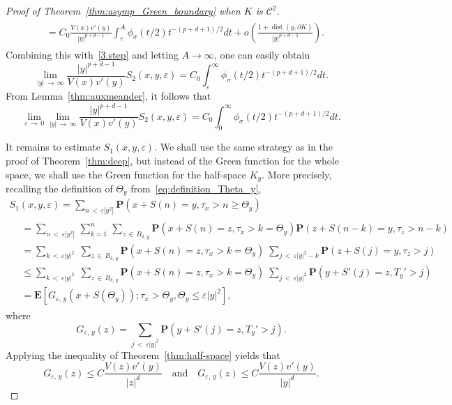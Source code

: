 \documentclass[AHL,Unicode,longabstracts,published]{cedram}
\DeclareMathOperator{\dist}{dist}
\newcommand{\clC}{\mathcal{C}}
\newcommand{\pr}{\mathbf{P}}
\newcommand{\e}{\mathbf{E}}
\renewcommand{\epsilon}{\varepsilon}
\renewcommand{\le}{\leqslant}
\renewcommand{\ge}{\geqslant}
\renewcommand{\leq}{\leqslant}
\begin{document}
\begin{proof}[Proof of Theorem~\ref{thm:asymp_Green_boundary} when $K$ is $\clC^{2}$]
\begin{multline*}
\begin{aligned}
&= C_0\frac{V(x)v'(y)}{|y|^{p+d-1}}\int_\varepsilon^A\phi_\sigma(t/2) t^{-(p+d+1)/2}dt +o\left(\frac{1+\dist(y, \partial K)}{|y|^{p+d-1}}\right).
\end{aligned}
\end{multline*}
Combining this with~\eqref{3.step} and letting $A\to\infty$, one can easily obtain
\[
\lim_{|y|\,\to\,\infty}\frac{|y|^{p+d-1}}{V(x)v'(y)}S_2(x,y,\varepsilon) =C_0\int_\varepsilon^\infty \phi_\sigma(t/2) t^{-(p+d+1)/2}dt.
\]
From Lemma~\ref{thm:auxmeander}, it follows that
\begin{equation}\label{S2.boundary}
\lim_{\varepsilon\,\to\,0}\lim_{|y|\,\to\,\infty}\frac{|y|^{p+d-1}}{V(x)v'(y)}S_2(x,y,\varepsilon) =C_0\int_0^\infty \phi_\sigma(t/2) t^{-(p+d+1)/2}dt.
\end{equation}

It remains to estimate $S_1(x,y,\varepsilon)$. We shall use the same strategy as in the proof of Theorem~\ref{thm:deep}, but instead of the Green function for the whole space, we shall use the Green function for the half-space $K_y$. More precisely, recalling the definition of $\Theta_y$ from~\eqref{eq:definition_Theta_y},
\begin{multline*}
S_1(x,y,\varepsilon)=\sum_{n\,<\,\varepsilon\left|y^2\right|}\pr\left(x+S(n)=y,\tau_x>n\ge\Theta_y\right)\\
\begin{aligned}
&=\sum_{n\,<\,\varepsilon\left|y^2\right|}\,\sum_{k=1}^n\,\sum_{z\,\in\,B_{\delta,\,y}}\!\!
\pr\left(x+S(n)=z,\tau_x>k=\Theta_y\right)\pr\left(z+S(n-k)=y,\tau_z>n-k\right)\\
&= \sum_{k\,<\,\varepsilon|y|^2}\;\sum_{z\,\in\,B_{\delta,\,y}}
\pr\left(x+S(n)=z,\tau_x>k=\Theta_y\right)\;\sum_{j\,<\,\varepsilon|y|^2-k}\pr\left(z+S(j)=y,\tau_z>j\right)\\
&\le \sum_{k\,<\,\varepsilon|y|^2}\;\sum_{z\,\in\, B_{\delta,\,y}}
\pr\left(x+S(n)=z,\tau_x>k=\Theta_y\right)\;\sum_{j\,<\,\varepsilon|y|^2}\pr\left(y+S'(j)=z,T_y'>j\right)\\
&=\e\left[G_{\varepsilon,\,y}\left(x+S\left(\Theta_y\right)\right);\tau_x>\Theta_y,\Theta_y\le\varepsilon|y|^2\right],
\end{aligned}
\end{multline*}
where
\[
G_{\varepsilon,\,y}(z)=\sum_{j\,<\,\varepsilon|y|^2}\pr\left(y+S'(j)=z,T_y'>j\right).
\]
Applying the inequality of Theorem~\ref{thm:half-space} yields that
\[
G_{\epsilon,\,y}(z)\leq C\frac{V(z)v'(y)}{|z|^d}\quad\text{and}\quad G_{\epsilon,\,y}(z)\leq C\frac{V(z)v'(y)}{|y|^d}.
\]
\end{proof}
\end{document}
